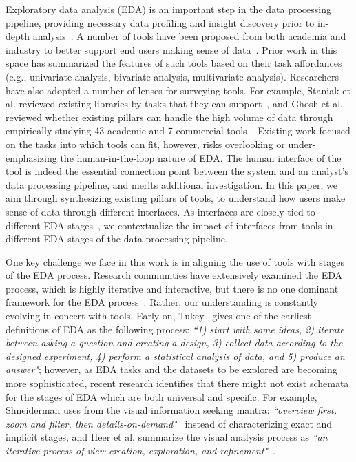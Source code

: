 \documentclass[11pt]{article}
\begin{document}
Exploratory data analysis (EDA) is an important step in the data processing pipeline, providing necessary data profiling and insight discovery prior to in-depth analysis~\cite{DBLP:journals/corr/abs-1911-00568}. A number of tools have been proposed from both academia and industry to better support end users making sense of data~\cite{powerbi, tableau, DBLP:journals/tvcg/StolteTH02, DBLP:conf/icde/LuoQ0018, DBLP:journals/pvldb/VartakRMPP15, DBLP:journals/ivs/CuiBYE19, DBLP:journals/pvldb/LeeTABCKMSYHP21, DBLP:conf/sigmod/PengWLBYXCRW21, DBLP:journals/pvldb/Kraska18, DBLP:journals/pvldb/SiddiquiKLKP16, DBLP:conf/chi/WongsuphasawatQ17, DBLP:conf/cidr/WuPMZR17, DBLP:journals/jossw/VanderPlasGHMWS18}. Prior work in this space has summarized the features of such tools based on their task affordances (e.g., univariate analysis, bivariate analysis, multivariate analysis). Researchers have also adopted a number of lenses for surveying tools. For example, Staniak et al. reviewed existing libraries by tasks that they can support~\cite{DBLP:journals/rjour/StaniakB19}, and Ghosh et al. reviewed whether existing pillars can handle the high volume of data through empirically studying 43 academic and 7 commercial tools~\cite{DBLP:journals/vi/GhoshNMQM18}. Existing work focused on the tasks into which tools can fit, however, risks overlooking or under-emphasizing the human-in-the-loop nature of EDA. The human interface of the tool is indeed the essential connection point between the system and an analyst's data processing pipeline, and merits additional investigation. In this paper, we aim through synthesizing existing pillars of tools, to understand how users make sense of data through different interfaces. As interfaces are closely tied to different EDA stages~\cite{DBLP:journals/cgf/BattleH19}, we contextualize the impact of interfaces from tools in different EDA stages of the data processing pipeline.


One key challenge we face in this work is in aligning the use of tools with stages of the EDA process. Research communities have extensively examined the EDA process, which is highly iterative and interactive, but there is no one dominant framework for the EDA process~\cite{yan2021tessera, DBLP:journals/cgf/BattleH19}. Rather, our understanding is constantly evolving in concert with tools. Early on, Tukey~\cite{martinez2017exploratory} gives one of the earliest definitions of EDA as the following process: \emph{``1) start with some ideas, 2) iterate between asking a question and creating a design, 3) collect data according to the designed experiment, 4) perform a statistical analysis of data, and 5) produce an answer"};  however, as EDA tasks and the datasets to be explored are becoming more sophisticated, recent research identifies that there might not exist schemata for the stages of EDA which are both universal and specific. For example, Shneiderman uses from the visual information seeking mantra: \emph{``overview first, zoom and filter, then details-on-demand"}~\cite{DBLP:conf/vl/Shneiderman96} instead of characterizing exact and implicit stages, and Heer et al. summarize the visual analysis process as \emph{``an iterative
process of view creation, exploration,
and refinement"}~\cite{DBLP:journals/cacm/HeerS12}.
\end{document}
